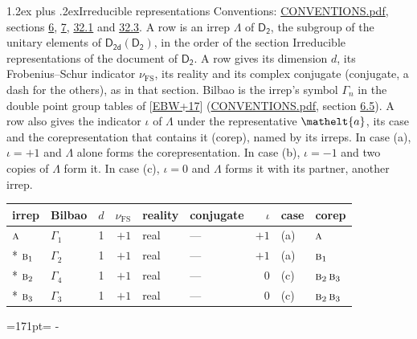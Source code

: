 \documentclass[10pt,a4paper]{article}
\makeatletter
\renewcommand\section{\@startsection{section}{1}{\z@}{-3ex plus -1ex minus -.2ex}%
  {1.2ex plus .2ex}{\normalfont\large\sffamily\bfseries\color{parttitle}}}
\newcommand{\needspace}[1]{\par\penalty-100\begingroup\dimen0=#1\relax\dimen2=\pagegoal
  \advance\dimen2-\pagetotal\ifdim\dimen0>\dimen2\relax\ifdim\dimen2>0pt\vfil\break\fi\fi
  \endgroup}
\numberwithin{equation}{section}
\newcommand{\eltfont}[1]{{\let\sigma\eltsigma\mathelt{#1}}}
\newcommand{\grp}[1]{\mathsf{#1}}
\newcommand{\irr}[1]{\text{\normalfont\scshape #1}}
\newcommand{\elt}[1]{\eltfont{#1}}
\newcommand{\fsind}{\nu_{\mathrm{FS}}}
\makeatother
\begin{document}
\section{Irreducible representations}\label{s:irreps}
Conventions: \href{../../CONVENTIONS.pdf}{CONVENTIONS.pdf}, sections \href{../../../rotation/CONVENTIONS.pdf\#conv.6}{6}, \href{../../../rotation/CONVENTIONS.pdf\#conv.7}{7}, \href{../../CONVENTIONS.pdf\#conv.32.1}{32.1} and \href{../../CONVENTIONS.pdf\#conv.32.3}{32.3}.
\leavevmode\label{n:irrep.Delta}A row is an irrep $\Lambda$ of $\grp{D_{2}}$, the subgroup of the unitary elements of $\grp{D_{2d}}(\grp{D_{2}})$, in the order of the section Irreducible representations of the document of \href{../../../rotation/data/pdf/D2.pdf}{$\grp{D_{2}}$}. \label{n:index.dimension}\label{n:index.frobenius}\label{n:head.irrep}\label{n:head.reality}\label{n:head.conjugate}A row gives its dimension $d$, its Frobenius--Schur indicator $\fsind$, its reality and its complex conjugate (conjugate, a dash for the others), as in that section. \label{n:head.bilbao}\label{n:irrep.alias.gamma}Bilbao is the irrep's symbol $\Gamma_n$ in the double point group tables of [\href{../../../REFERENCES.pdf\#ref.EBW+17}{EBW+17}] (\href{../../CONVENTIONS.pdf}{CONVENTIONS.pdf}, section \href{../../../rotation/CONVENTIONS.pdf\#conv.6.5}{6.5}). \label{n:head.case.corep}\label{n:head.corep}A row also gives the indicator $\iota$ of $\Lambda$ under the representative $\elt{a}$, its case and the corepresentation that contains it (corep), named by its irreps. In case (a), $\iota = +1$ and $\Lambda$ alone forms the corepresentation. In case (b), $\iota = -1$ and two copies of $\Lambda$ form it. In case (c), $\iota = 0$ and $\Lambda$ forms it with its partner, another irrep.
\setlength{\emergencystretch}{2em}\par\setlength{\emergencystretch}{0pt}
{\small\renewcommand{\arraystretch}{1.25}\setlength{\tabcolsep}{4pt}\begin{longtable}{@{}llrrllrll@{}}\toprule
irrep & Bilbao & $d$ & $\fsind$ & reality & conjugate & $\iota$ & case & corep\\\midrule\endhead
\bottomrule\endfoot\endlastfoot
$\irr{a}$ & $\Gamma_{1}$ & 1 & $+1$ & real & --- & $+1$ & (a) & $\irr{a}$\\*
$\irr{b}_{1}$ & $\Gamma_{2}$ & 1 & $+1$ & real & --- & $+1$ & (a) & $\irr{b}_{1}$\\*
$\irr{b}_{2}$ & $\Gamma_{4}$ & 1 & $+1$ & real & --- & $0$ & (c) & $\irr{b}_{2}\,\irr{b}_{3}$\\*
$\irr{b}_{3}$ & $\Gamma_{3}$ & 1 & $+1$ & real & --- & $0$ & (c) & $\irr{b}_{2}\,\irr{b}_{3}$\\
\bottomrule\end{longtable}}
\needspace{171pt}
\end{document}
